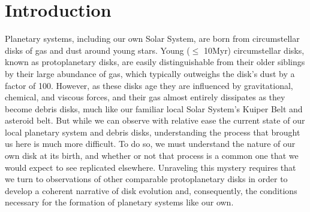 \chapter{Introduction}
\label{chap:introduction}

%





Planetary systems, including our own Solar System, are born from circumstellar disks of gas and dust around young stars. Young ($\leq$ 10Myr) circumstellar disks, known as protoplanetary disks, are easily distinguishable from their older siblings by their large abundance of gas, which typically outweighs the disk's dust by a factor of 100. However, as these disks age they are influenced by gravitational, chemical, and viscous forces, and their gas almost entirely dissipates as they become debris disks, much like our familiar local Solar System's Kuiper Belt and asteroid belt. But while we can observe with relative ease the current state of our local planetary system and debris disks, understanding the process that brought us here is much more difficult. To do so, we must understand the nature of our own disk at its birth, and whether or not that process is a common one that we would expect to see replicated elsewhere. Unraveling this mystery requires that we turn to observations of other comparable protoplanetary disks in order to develop a coherent narrative of disk evolution and, consequently, the conditions necessary for the formation of planetary systems like our own.

